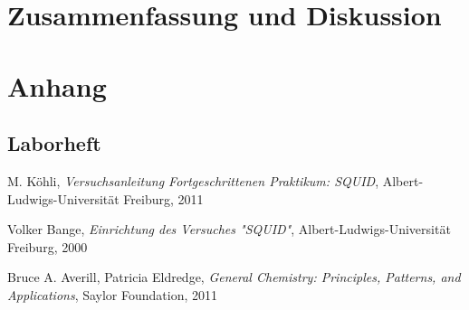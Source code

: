 \documentclass[12pt]{article}
\begin{document}
\newpage
\section{Zusammenfassung und Diskussion}


\newpage
\section{Anhang}




%


%

\subsection{Laborheft}
\label{Laborbuch}
\newpage
\listoffigures


\newpage
\thispagestyle{empty}
\begin{thebibliography}{9}

  

  
  

M. Köhli,
\emph{Versuchsanleitung Fortgeschrittenen Praktikum: SQUID},
Albert-Ludwigs-Universität Freiburg,
2011

Volker Bange,
\emph{Einrichtung des Versuches "SQUID"},
Albert-Ludwigs-Universität Freiburg,
2000

Bruce A. Averill, Patricia Eldredge,
\emph{General Chemistry: Principles, Patterns, and Applications},
Saylor Foundation,
2011
\end{thebibliography}
\end{document}
